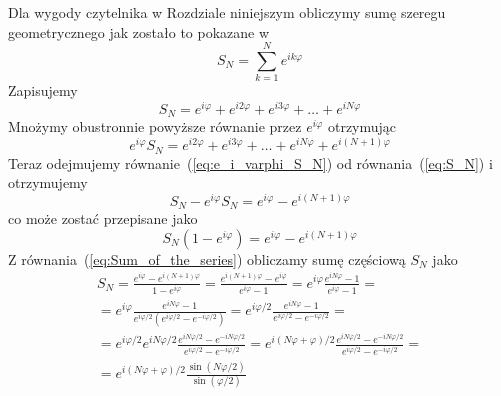 Dla wygody czytelnika w Rozdziale niniejszym obliczymy sumę szeregu geometrycznego jak zostało to pokazane w~\cite{kn:Hirst_Book}
\begin{equation}
S_{N} = \sum_{k=1}^{N} e^{ik\varphi} 
\end{equation}
Zapisujemy
\begin{equation}
\label{eq:S_N}
S_{N}
=
e^{i\varphi} + e^{i2\varphi} +  e^{i3\varphi} + \ldots + e^{iN\varphi}
\end{equation}
Mnożymy obustronnie powyższe równanie przez $e^{i\varphi}$ 
otrzymując
\begin{equation}
\label{eq:e_i_varphi_S_N}
e^{i\varphi} S_{N} 
=
e^{i2\varphi} +  e^{i3\varphi} + \ldots + e^{iN\varphi} + e^{i(N+1)\varphi}
\end{equation}
Teraz odejmujemy równanie~(\ref{eq:e_i_varphi_S_N}) od równania~(\ref{eq:S_N}) i otrzymujemy
\begin{equation}
S_{N} - e^{i\varphi} S_{N} 
=
e^{i\varphi} - e^{i(N+1)\varphi}
\end{equation}
co może zostać przepisane jako
\begin{equation}
\label{eq:Sum_of_the_series}
S_{N}(1 - e^{i\varphi})
=
e^{i\varphi} - e^{i(N+1)\varphi}
\end{equation}
Z równania~(\ref{eq:Sum_of_the_series}) obliczamy sumę częściową $S_{N}$ jako
\begin{eqnarray}
\label{eq:Sum_of_the_series_now}
S_{N}
=
\frac{e^{i\varphi} - e^{i(N+1)\varphi}}{1 - e^{i\varphi}}
=
\frac{e^{i(N+1)\varphi} - e^{i\varphi}}{e^{i\varphi} - 1}
=
e^{i\varphi} \frac{e^{iN\varphi} - 1}{e^{i\varphi} - 1}  =   \\ \nonumber
=
e^{i\varphi} \frac{e^{iN\varphi} - 1}{e^{i\varphi/2} (e^{i\varphi/2} - e^{-i\varphi/2})}
=
e^{i\varphi/2} \frac{e^{iN\varphi} - 1}{e^{i\varphi/2} - e^{-i\varphi/2}} =                     \\ \nonumber
=
e^{i\varphi/2} e^{iN\varphi/2}   \frac{e^{iN\varphi/2} - e^{-iN\varphi/2}}{e^{i\varphi/2} - e^{-i\varphi/2}} 
=
e^{i(N\varphi + \varphi)/2}  \frac{e^{iN\varphi/2} - e^{-iN\varphi/2}}{e^{i\varphi/2} - e^{-i\varphi/2}}   =      \\ \nonumber
=
e^{i(N\varphi + \varphi)/2}  \frac{\sin(N\varphi/2)}{\sin(\varphi/2)}
\end{eqnarray}
